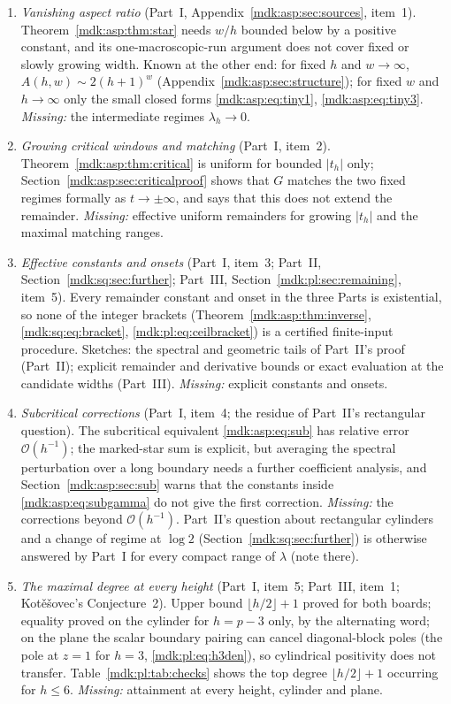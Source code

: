 \documentclass[11pt,letterpaper]{article}
\numberwithin{equation}{section}
\theoremstyle{remark}\newtheorem{remark}[theorem]{Remark}
\newcommand{\Oh}{\mathcal O}\newcommand{\Q}{\mathbb Q}\newcommand{\N}{\mathbb N}\newcommand{\R}{\mathbb R}
\begin{document}
\begin{enumerate}[leftmargin=1.6em]
\item\label{mdk:q:smallratio} \emph{Vanishing aspect ratio} (Part~I, Appendix~\ref{mdk:asp:sec:sources}, item~1). Theorem~\ref{mdk:asp:thm:star} needs $w/h$ bounded below by a positive constant, and its one-macroscopic-run argument does not cover fixed or slowly growing width. Known at the other end: for fixed $h$ and $w\to\infty$, $A(h,w)\sim2(h+1)^w$ (Appendix~\ref{mdk:asp:sec:structure}); for fixed $w$ and $h\to\infty$ only the small closed forms \eqref{mdk:asp:eq:tiny1}, \eqref{mdk:asp:eq:tiny3}. \emph{Missing:} the intermediate regimes $\lambda_h\to0$.
\item\label{mdk:q:window} \emph{Growing critical windows and matching} (Part~I, item~2). Theorem~\ref{mdk:asp:thm:critical} is uniform for bounded $|t_h|$ only; Section~\ref{mdk:asp:sec:criticalproof} shows that $G$ matches the two fixed regimes formally as $t\to\pm\infty$, and says that this does not extend the remainder. \emph{Missing:} effective uniform remainders for growing $|t_h|$ and the maximal matching ranges.
\item\label{mdk:q:effective} \emph{Effective constants and onsets} (Part~I, item~3; Part~II, Section~\ref{mdk:sq:sec:further}; Part~III, Section~\ref{mdk:pl:sec:remaining}, item~5). Every remainder constant and onset in the three Parts is existential, so none of the integer brackets (Theorem~\ref{mdk:asp:thm:inverse}, \eqref{mdk:sq:eq:bracket}, \eqref{mdk:pl:eq:ceilbracket}) is a certified finite-input procedure. Sketches: the spectral and geometric tails of Part~II's proof (Part~II); explicit remainder and derivative bounds or exact evaluation at the candidate widths (Part~III). \emph{Missing:} explicit constants and onsets.
\item\label{mdk:q:subcritical} \emph{Subcritical corrections} (Part~I, item~4; the residue of Part~II's rectangular question). The subcritical equivalent \eqref{mdk:asp:eq:sub} has relative error $\Oh(h^{-1})$; the marked-star sum is explicit, but averaging the spectral perturbation over a long boundary needs a further coefficient analysis, and Section~\ref{mdk:asp:sec:sub} warns that the constants inside \eqref{mdk:asp:eq:subgamma} do not give the first correction. \emph{Missing:} the corrections beyond $\Oh(h^{-1})$. Part~II's question about rectangular cylinders and a change of regime at $\log2$ (Section~\ref{mdk:sq:sec:further}) is otherwise answered by Part~I for every compact range of $\lambda$ (note there).
\item\label{mdk:q:degree} \emph{The maximal degree at every height} (Part~I, item~5; Part~III, item~1; Kot\v e\v sovec's Conjecture~2). Upper bound $\lfloor h/2\rfloor+1$ proved for both boards; equality proved on the cylinder for $h=p-3$ only, by the alternating word; on the plane the scalar boundary pairing can cancel diagonal-block poles (the pole at $z=1$ for $h=3$, \eqref{mdk:pl:eq:h3den}), so cylindrical positivity does not transfer. Table~\ref{mdk:pl:tab:checks} shows the top degree $\lfloor h/2\rfloor+1$ occurring for $h\le6$. \emph{Missing:} attainment at every height, cylinder and plane.

\end{enumerate}
\end{document}
